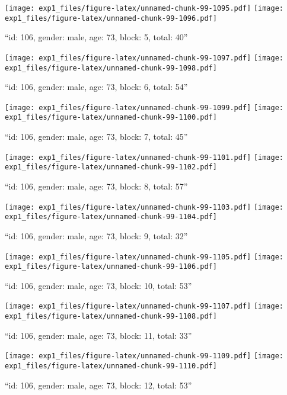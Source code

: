 \documentclass[,]{article}
\begin{document}
\texttt{[image: exp1\_files/figure-latex/unnamed-chunk-99-1095.pdf]}
\texttt{[image: exp1\_files/figure-latex/unnamed-chunk-99-1096.pdf]}

\newpage
[1] 

``id: 106, gender: male, age: 73, block: 5, total: 40''

\texttt{[image: exp1\_files/figure-latex/unnamed-chunk-99-1097.pdf]}
\texttt{[image: exp1\_files/figure-latex/unnamed-chunk-99-1098.pdf]}

\newpage
[1] 

``id: 106, gender: male, age: 73, block: 6, total: 54''

\texttt{[image: exp1\_files/figure-latex/unnamed-chunk-99-1099.pdf]}
\texttt{[image: exp1\_files/figure-latex/unnamed-chunk-99-1100.pdf]}

\newpage
[1] 

``id: 106, gender: male, age: 73, block: 7, total: 45''

\texttt{[image: exp1\_files/figure-latex/unnamed-chunk-99-1101.pdf]}
\texttt{[image: exp1\_files/figure-latex/unnamed-chunk-99-1102.pdf]}

\newpage
[1] 

``id: 106, gender: male, age: 73, block: 8, total: 57''

\texttt{[image: exp1\_files/figure-latex/unnamed-chunk-99-1103.pdf]}
\texttt{[image: exp1\_files/figure-latex/unnamed-chunk-99-1104.pdf]}

\newpage
[1] 

``id: 106, gender: male, age: 73, block: 9, total: 32''

\texttt{[image: exp1\_files/figure-latex/unnamed-chunk-99-1105.pdf]}
\texttt{[image: exp1\_files/figure-latex/unnamed-chunk-99-1106.pdf]}

\newpage
[1] 

``id: 106, gender: male, age: 73, block: 10, total: 53''

\texttt{[image: exp1\_files/figure-latex/unnamed-chunk-99-1107.pdf]}
\texttt{[image: exp1\_files/figure-latex/unnamed-chunk-99-1108.pdf]}

\newpage
[1] 

``id: 106, gender: male, age: 73, block: 11, total: 33''

\texttt{[image: exp1\_files/figure-latex/unnamed-chunk-99-1109.pdf]}
\texttt{[image: exp1\_files/figure-latex/unnamed-chunk-99-1110.pdf]}

\newpage
[1] 

``id: 106, gender: male, age: 73, block: 12, total: 53''
\end{document}
